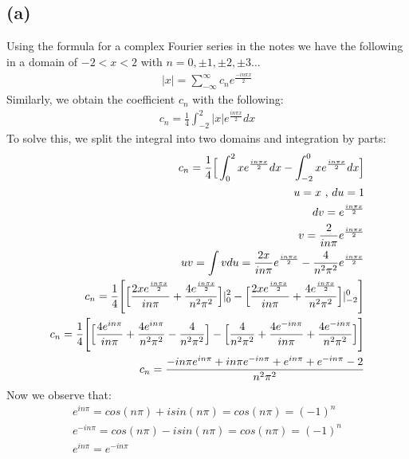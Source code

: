 \documentclass{article}
\begin{document}
\subsection*{\textbf{(a)}}
Using the formula for a complex Fourier series in the notes we have the following in a domain of $-2< x < 2$ with $n=0, \pm 1, \pm 2, \pm 3...$
\begin{equation}
\begin{aligned}
|x| = \sum_{-\infty}^{\infty}c_ne^{\frac{-in\pi x}{2}}
\end{aligned}
\end{equation}
Similarly, we obtain the coefficient $c_n$ with the following:
\begin{equation}
\begin{aligned}
c_n = \frac{1}{4}\int_{-2}^2 |x|e^{\frac{in\pi x}{2}}dx
\end{aligned}
\end{equation}
To solve this, we split the integral into two domains and integration by parts:
\begin{equation}
\begin{aligned}
c_n = \frac{1}{4}\Big{[}\int_{0}^2 xe^{\frac{in\pi x}{2}}dx - \int_{-2}^{0} xe^{\frac{in\pi x}{2}}dx \Big{]}\\
u = x \text{ , } du = 1\\
dv = e^{\frac{in\pi x}{2}}\\
v = \frac{2}{in\pi}e^{\frac{in\pi x}{2}}\\
uv = \int vdu = \frac{2x}{in\pi}e^{\frac{in\pi x}{2}} - \frac{4}{n^2\pi^2}e^{\frac{in\pi x}{2}}\\
c_n = \frac{1}{4}\Bigg{[}\Big{[}\frac{2xe^{\frac{in\pi x}{2}}}{in\pi} + \frac{4e^{\frac{in\pi x}{2}}}{n^2\pi^2}\Big{]}|^2_0 - \Big{[}\frac{2xe^{\frac{in\pi x}{2}}}{in\pi} + \frac{4e^{\frac{in\pi x}{2}}}{n^2\pi^2}\Big{]}|^0_{-2}\Bigg{]}\\
c_n = \frac{1}{4}\Bigg{[}\Big{[}\frac{4e^{in\pi}}{in\pi} + \frac{4e^{in\pi}}{n^2\pi^2} - \frac{4}{n^2\pi^2}\Big{]} - \Big{[}\frac{4}{n^2\pi^2}+\frac{4e^{-in\pi}}{in\pi} + \frac{4e^{-in\pi}}{n^2\pi^2}\Big{]}\Bigg{]}\\
c_n = \frac{-in\pi e^{in\pi}+in\pi e^{-in\pi} + e^{in\pi} + e^{-in\pi} - 2}{n^2\pi^2}
\end{aligned}
\end{equation}
Now we observe that:
\begin{equation}
\begin{aligned}
e^{in\pi} = cos(n\pi) + isin(n\pi) = cos(n\pi) = (-1)^n\\
e^{-in\pi} = cos(n\pi) - isin(n\pi) = cos(n\pi) = (-1)^n\\
e^{in\pi} = e^{-in\pi}
\end{aligned}
\end{equation}
\end{document}
